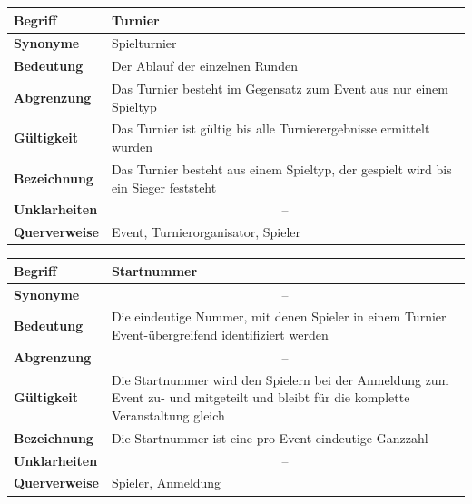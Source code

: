 \documentclass[11pt]{article}
\begin{document}
\begin{tabularx}{\textwidth}{| p{} | p{} |}
	\hline
	\textbf{Begriff} & Turnier\\
	\hline
	\textbf{Synonyme} & Spielturnier \\
	\hline
	\textbf{Bedeutung} & Der Ablauf der einzelnen Runden\\
	\hline
	\textbf{Abgrenzung} & Das Turnier besteht im Gegensatz zum Event aus nur einem Spieltyp\\
	\hline
	\textbf{Gültigkeit} & Das Turnier ist gültig bis alle Turnierergebnisse ermittelt wurden\\
	\hline
	\textbf{Bezeichnung} & Das Turnier besteht aus einem Spieltyp, der gespielt wird bis ein Sieger feststeht\\
	\hline
	\textbf{Unklarheiten} & \multicolumn{1}{|c|}{--} \\
	\hline
	\textbf{Querverweise} & Event, Turnierorganisator, Spieler \\
	\hline
\end{tabularx}
	
\begin{tabularx}{\textwidth}{| p{} | p{} |}
	\hline
	\textbf{Begriff} & Startnummer\\
	\hline
	\textbf{Synonyme} & \multicolumn{1}{|c|}{--} \\
	\hline
	\textbf{Bedeutung} & Die eindeutige Nummer, mit denen Spieler in einem Turnier Event-übergreifend identifiziert werden\\
	\hline
	\textbf{Abgrenzung} & \multicolumn{1}{|c|}{--} \\
	\hline
	\textbf{Gültigkeit} & Die Startnummer wird den Spielern bei der Anmeldung zum Event zu- und mitgeteilt und bleibt für die komplette Veranstaltung gleich\\
	\hline
	\textbf{Bezeichnung} & Die Startnummer ist eine pro Event eindeutige Ganzzahl\\
	\hline
	\textbf{Unklarheiten} & \multicolumn{1}{|c|}{--} \\
	\hline
	\textbf{Querverweise} & Spieler, Anmeldung \\
	\hline
\end{tabularx}
\end{document}
